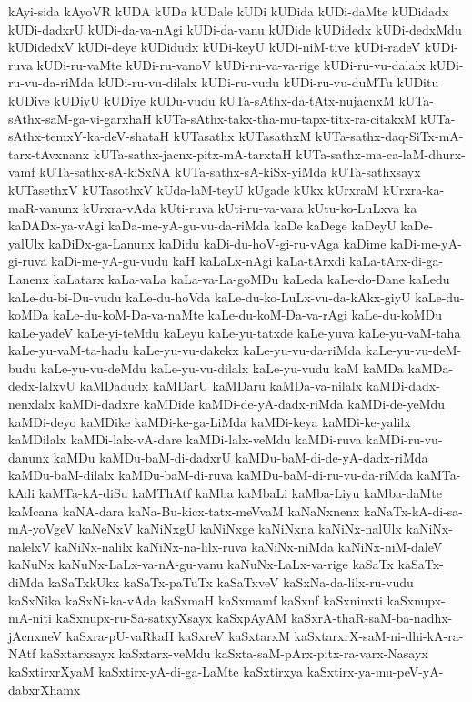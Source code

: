 {kAyi-sida
kAyoVR
kUDA
kUDa
kUDale
kUDi
kUDida
kUDi-daMte
kUDidadx
kUDi-dadxrU
kUDi-da-va-nAgi
kUDi-da-vanu
kUDide
kUDidedx
kUDi-dedxMdu
kUDidedxV
kUDi-deye
kUDidudx
kUDi-keyU
kUDi-niM-tive
kUDi-radeV
kUDi-ruva
kUDi-ru-vaMte
kUDi-ru-vanoV
kUDi-ru-va-va-rige
kUDi-ru-vu-dalalx
kUDi-ru-vu-da-riMda
kUDi-ru-vu-dilalx
kUDi-ru-vudu
kUDi-ru-vu-duMTu
kUDitu
kUDive
kUDiyU
kUDiye
kUDu-vudu
kUTa-sAthx-da-tAtx-nujacnxM
kUTa-sAthx-saM-ga-vi-garxhaH
kUTa-sAthx-takx-tha-mu-tapx-titx-ra-citakxM
kUTa-sAthx-temxY-ka-deV-shataH
kUTasathx
kUTasathxM
kUTa-sathx-daq-SiTx-mA-tarx-tAvxnanx
kUTa-sathx-jacnx-pitx-mA-tarxtaH
kUTa-sathx-ma-ca-laM-dhurx-vamf
kUTa-sathx-sA-kiSxNA
kUTa-sathx-sA-kiSx-yiMda
kUTa-sathxsayx
kUTasethxV
kUTasothxV
kUda-laM-teyU
kUgade
kUkx
kUrxraM
kUrxra-ka-maR-vanunx
kUrxra-vAda
kUti-ruva
kUti-ru-va-vara
kUtu-ko-LuLxva
ka
kaDADx-ya-vAgi
kaDa-me-yA-gu-vu-da-riMda
kaDe
kaDege
kaDeyU
kaDe-yalUlx
kaDiDx-ga-Lanunx
kaDidu
kaDi-du-hoV-gi-ru-vAga
kaDime
kaDi-me-yA-gi-ruva
kaDi-me-yA-gu-vudu
kaH
kaLaLx-nAgi
kaLa-tArxdi
kaLa-tArx-di-ga-Lanenx
kaLatarx
kaLa-vaLa
kaLa-va-La-goMDu
kaLeda
kaLe-do-Dane
kaLedu
kaLe-du-bi-Du-vudu
kaLe-du-hoVda
kaLe-du-ko-LuLx-vu-da-kAkx-giyU
kaLe-du-koMDa
kaLe-du-koM-Da-va-naMte
kaLe-du-koM-Da-va-rAgi
kaLe-du-koMDu
kaLe-yadeV
kaLe-yi-teMdu
kaLeyu
kaLe-yu-tatxde
kaLe-yuva
kaLe-yu-vaM-taha
kaLe-yu-vaM-ta-hadu
kaLe-yu-vu-dakekx
kaLe-yu-vu-da-riMda
kaLe-yu-vu-deM-budu
kaLe-yu-vu-deMdu
kaLe-yu-vu-dilalx
kaLe-yu-vudu
kaM
kaMDa
kaMDa-dedx-lalxvU
kaMDadudx
kaMDarU
kaMDaru
kaMDa-va-nilalx
kaMDi-dadx-nenxlalx
kaMDi-dadxre
kaMDide
kaMDi-de-yA-dadx-riMda
kaMDi-de-yeMdu
kaMDi-deyo
kaMDike
kaMDi-ke-ga-LiMda
kaMDi-keya
kaMDi-ke-yalilx
kaMDilalx
kaMDi-lalx-vA-dare
kaMDi-lalx-veMdu
kaMDi-ruva
kaMDi-ru-vu-danunx
kaMDu
kaMDu-baM-di-dadxrU
kaMDu-baM-di-de-yA-dadx-riMda
kaMDu-baM-dilalx
kaMDu-baM-di-ruva
kaMDu-baM-di-ru-vu-da-riMda
kaMTa-kAdi
kaMTa-kA-diSu
kaMThAtf
kaMba
kaMbaLi
kaMba-Liyu
kaMba-daMte
kaMcana
kaNA-dara
kaNa-Bu-kicx-tatx-meVvaM
kaNaNxnenx
kaNaTx-kA-di-sa-mA-yoVgeV
kaNeNxV
kaNiNxgU
kaNiNxge
kaNiNxna
kaNiNx-nalUlx
kaNiNx-nalelxV
kaNiNx-nalilx
kaNiNx-na-lilx-ruva
kaNiNx-niMda
kaNiNx-niM-daleV
kaNuNx
kaNuNx-LaLx-va-nA-gu-vanu
kaNuNx-LaLx-va-rige
kaSaTx
kaSaTx-diMda
kaSaTxkUkx
kaSaTx-paTuTx
kaSaTxveV
kaSxNa-da-lilx-ru-vudu
kaSxNika
kaSxNi-ka-vAda
kaSxmaH
kaSxmamf
kaSxnf
kaSxninxti
kaSxnupx-mA-niti
kaSxnupx-ru-Sa-satxyXsayx
kaSxpAyAM
kaSxrA-thaR-saM-ba-nadhx-jAcnxneV
kaSxra-pU-vaRkaH
kaSxreV
kaSxtarxM
kaSxtarxrX-saM-ni-dhi-kA-ra-NAtf
kaSxtarxsayx
kaSxtarx-veMdu
kaSxta-saM-pArx-pitx-ra-varx-Nasayx
kaSxtirxrXyaM
kaSxtirx-yA-di-ga-LaMte
kaSxtirxya
kaSxtirx-ya-mu-peV-yA-dabxrXhamx
}
